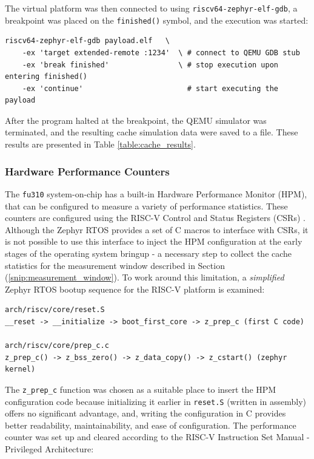 \noindent The virtual platform was then connected to using \texttt{riscv64-zephyr-elf-gdb}, a breakpoint was placed on the \texttt{finished()} symbol, and the execution was started:
\begin{verbatim}
riscv64-zephyr-elf-gdb payload.elf   \
	-ex 'target extended-remote :1234'  \ # connect to QEMU GDB stub
	-ex 'break finished'                \ # stop execution upon entering finished()
	-ex 'continue'                        # start executing the payload
\end{verbatim}

\noindent After the program halted at the breakpoint, the QEMU simulator was terminated, and the resulting cache simulation data were saved to a file. These results are presented in
Table \ref{table:cache_results}.


\subsubsection{Hardware Performance Counters}
The \texttt{fu310} system-on-chip has a built-in Hardware Performance Monitor (HPM), that can be configured to measure a variety of performance statistics. These counters are configured
using the RISC-V Control and Status Registers (CSRs) \cite{fe310docs, riscvisa}.
Although the Zephyr RTOS provides a set of C macros to interface with CSRs, it is not possible to use this interface to inject the HPM configuration at the early stages of the
operating system bringup - a necessary step to collect the cache statistics for the measurement window described in Section (\ref{snip:measurement_window}). To work around this limitation,
a \textit{simplified} Zephyr RTOS bootup sequence for the RISC-V platform is examined:

\begin{verbatim}
arch/riscv/core/reset.S
__reset -> __initialize -> boot_first_core -> z_prep_c (first C code)

arch/riscv/core/prep_c.c
z_prep_c() -> z_bss_zero() -> z_data_copy() -> z_cstart() (zephyr kernel)
\end{verbatim}

\noindent The \texttt{z\_prep\_c} function was chosen as a suitable place to insert the HPM configuration code because initializing it earlier in \texttt{reset.S} (written in
assembly) offers no significant advantage, and,  writing the configuration in C provides better readability, maintainability, and ease of configuration. The performance counter
was set up and cleared according to the RISC-V Instruction Set Manual - Privileged Architecture:

